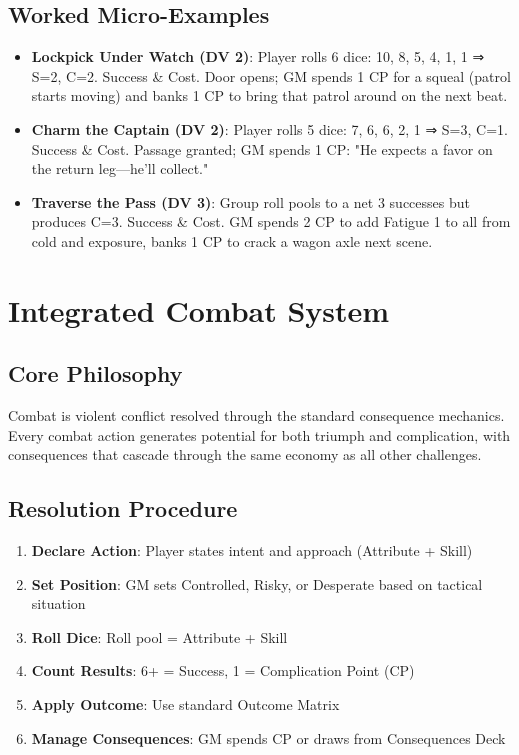 \documentclass[11pt]{article}
\begin{document}
\subsection{Worked Micro-Examples}
\begin{itemize}
    \item \textbf{Lockpick Under Watch (DV 2)}: Player rolls 6 dice: 10, 8, 5, 4, 1, 1 ⇒ S=2, C=2. Success \& Cost. Door opens; GM spends 1 CP for a squeal (patrol starts moving) and banks 1 CP to bring that patrol around on the next beat.
    \item \textbf{Charm the Captain (DV 2)}: Player rolls 5 dice: 7, 6, 6, 2, 1 ⇒ S=3, C=1. Success \& Cost. Passage granted; GM spends 1 CP: "He expects a favor on the return leg—he'll collect."
    \item \textbf{Traverse the Pass (DV 3)}: Group roll pools to a net 3 successes but produces C=3. Success \& Cost. GM spends 2 CP to add Fatigue 1 to all from cold and exposure, banks 1 CP to crack a wagon axle next scene.
\end{itemize}

\section{Integrated Combat System}

\subsection{Core Philosophy}
Combat is violent conflict resolved through the standard consequence mechanics. Every combat action generates potential for both triumph and complication, with consequences that cascade through the same economy as all other challenges.

\subsection{Resolution Procedure}
\begin{enumerate}
    \item \textbf{Declare Action}: Player states intent and approach (Attribute + Skill)
    \item \textbf{Set Position}: GM sets Controlled, Risky, or Desperate based on tactical situation
    \item \textbf{Roll Dice}: Roll pool = Attribute + Skill
    \item \textbf{Count Results}: 6+ = Success, 1 = Complication Point (CP)
    \item \textbf{Apply Outcome}: Use standard Outcome Matrix
    \item \textbf{Manage Consequences}: GM spends CP or draws from Consequences Deck
\end{enumerate}
\end{document}
